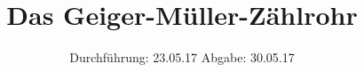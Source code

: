 

\subject{V703}
\title{Das Geiger-Müller-Zählrohr}
\date{
  Durchführung: 23.05.17
  \hspace{3em}
  Abgabe: 30.05.17
}



\maketitle
\thispagestyle{empty}
\tableofcontents
\newpage






\printbibliography


